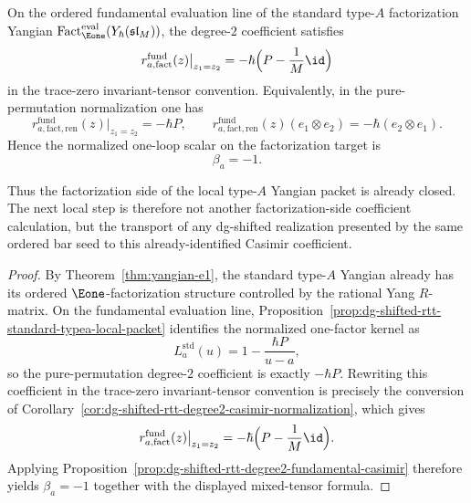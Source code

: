 \begin{corollary}
\label{cor:factorization-fundamental-casimir-identity}
On the ordered fundamental evaluation line of the standard type-$A$
factorization Yangian
$\operatorname{Fact}_{\Eone}^{\mathrm{eval}}(Y_\hbar(\mathfrak{sl}_M))$,
the degree-$2$ coefficient satisfies
\[
r_{a,\mathrm{fact}}^{\mathrm{fund}}(z)\big|_{z_1=z_2}
=
-\hbar\Bigl(P-\frac{1}{M}\id\Bigr)
\]
in the trace-zero invariant-tensor convention.  Equivalently, in the
pure-permutation normalization one has
\[
r_{a,\mathrm{fact,ren}}^{\mathrm{fund}}(z)\big|_{z_1=z_2}
=
-\hbar P,
\qquad
r_{a,\mathrm{fact,ren}}^{\mathrm{fund}}(z)(e_1\otimes e_2)
=
-\hbar(e_2\otimes e_1).
\]
Hence the normalized one-loop scalar on the factorization target is
\[
\beta_a=-1.
\]

Thus the factorization side of the local type-$A$ Yangian packet is
already closed.  The next local step is therefore not another
factorization-side coefficient calculation, but the transport of any
dg-shifted realization presented by the same ordered bar seed to this
already-identified Casimir coefficient.
\end{corollary}

\begin{proof}
By Theorem~\ref{thm:yangian-e1}, the standard type-$A$ Yangian already
has its ordered $\Eone$-factorization structure controlled by the
rational Yang $R$-matrix.  On the fundamental evaluation line,
Proposition~\ref{prop:dg-shifted-rtt-standard-typea-local-packet}
identifies the normalized one-factor kernel as
\[
L_a^{\mathrm{std}}(u)=1-\frac{\hbar P}{u-a},
\]
so the pure-permutation degree-$2$ coefficient is exactly
$-\hbar P$.  Rewriting this coefficient in the trace-zero
invariant-tensor convention is precisely the conversion of
Corollary~\ref{cor:dg-shifted-rtt-degree2-casimir-normalization}, which
gives
\[
r_{a,\mathrm{fact}}^{\mathrm{fund}}(z)\big|_{z_1=z_2}
=
-\hbar\Bigl(P-\frac{1}{M}\id\Bigr).
\]
Applying
Proposition~\ref{prop:dg-shifted-rtt-degree2-fundamental-casimir}
therefore yields $\beta_a=-1$ together with the displayed
mixed-tensor formula.
\end{proof}

